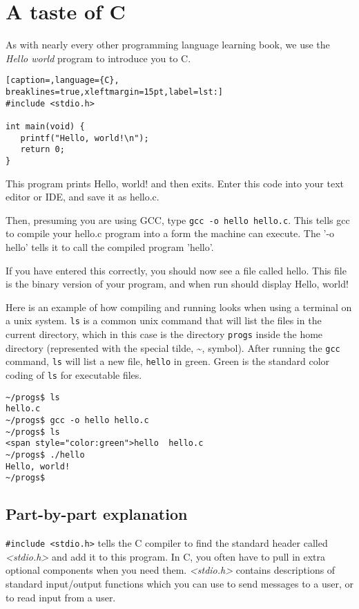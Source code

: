 \section{A taste of C}
As with nearly every other programming language learning book, we use the
\emph{Hello world} program to introduce you to C.

\lstset{basicstyle=\scriptsize, numbers=left, captionpos=b, tabsize=4}
\begin{lstlisting}[caption=,language={C},
breaklines=true,xleftmargin=15pt,label=lst:]
#include <stdio.h>

int main(void) {
   printf("Hello, world!\n");
   return 0;
}
\end{lstlisting}

This program prints Hello, world! and then exits.
Enter this code into your text editor or IDE, and save it as hello.c.

Then, presuming you are using GCC, type \texttt{gcc -o hello hello.c}. This
tells gcc to compile your hello.c program into a form the machine can execute.
The '-o hello' tells it to call the compiled program 'hello'.

If you have entered this correctly, you should now see a file called hello.
This file is the binary version of your program, and when run should display
Hello, world!

Here is an example of how compiling and running looks when using a terminal on
a unix system. \texttt{ls} is a common unix command that will list the files in
the current directory, which in this case is the directory \texttt{progs}
inside the home directory (represented with the special tilde, \~{}, symbol).
After running the \texttt{gcc} command, \texttt{ls} will list a new file,
\texttt{hello} in green. Green is the standard color coding of \texttt{ls} for
executable files. 

\begin{verbatim}
~/progs$ ls
hello.c
~/progs$ gcc -o hello hello.c
~/progs$ ls
<span style="color:green">hello  hello.c
~/progs$ ./hello
Hello, world!
~/progs$
\end{verbatim}

\subsection{Part-by-part explanation}
\texttt{\#include \textless{}stdio.h\textgreater{}} tells the C compiler to
find the standard header called \emph{\textless{stdio.h\textgreater{}}} and add
it to this program. In C, you often have to pull in extra optional components
when you need them. \emph{\textless{}stdio.h\textgreater{}} contains
descriptions of standard input/output functions which you can use to send
messages to a user, or to read input from a user.

